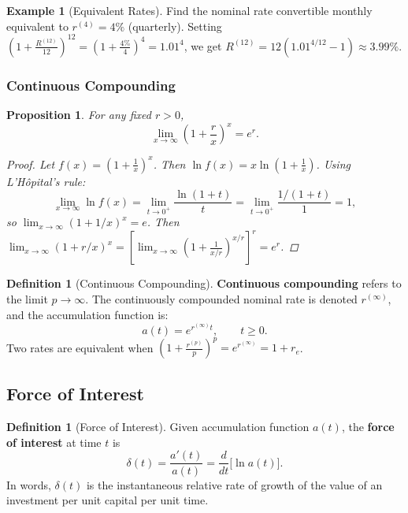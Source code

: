 \documentclass[12pt, a4paper]{article}
\theoremstyle{plain}
\newtheorem{proposition}[theorem]{Proposition}
\theoremstyle{definition}
\newtheorem{definition}[theorem]{Definition}
\newtheorem{example}[theorem]{Example}
\theoremstyle{remark}
\begin{document}
\begin{example}[Equivalent Rates]
  Find the nominal rate convertible monthly equivalent to $r^{(4)} = 4\%$ (quarterly). Setting $\left(1 + \frac{R^{(12)}}{12}\right)^{12} = \left(1 + \frac{4\%}{4}\right)^4 = 1.01^4$, we get $R^{(12)} = 12(1.01^{4/12} - 1) \approx 3.99\%$.
\end{example}

\subsubsection{Continuous Compounding}

\begin{proposition}
  For any fixed $r > 0$,
  \[
    \lim_{x \to \infty} \left(1 + \frac{r}{x}\right)^x = e^r.
  \]
  \begin{proof}
    Let $f(x) = \left(1 + \frac{1}{x}\right)^x$. Then $\ln f(x) = x \ln\!\left(1+\frac{1}{x}\right)$. Using L'Hôpital's rule:
    \[
      \lim_{x\to\infty} \ln f(x) = \lim_{t\to 0^+} \frac{\ln(1+t)}{t} = \lim_{t\to 0^+} \frac{1/(1+t)}{1} = 1,
    \]
    so $\lim_{x\to\infty}(1+1/x)^x = e$. Then $\lim_{x\to\infty}(1+r/x)^x = \left[\lim_{x\to\infty}(1+\frac{1}{x/r})^{x/r}\right]^r = e^r$.
  \end{proof}
\end{proposition}

\begin{definition}[Continuous Compounding]
  \textbf{Continuous compounding} refers to the limit $p \to \infty$. The continuously compounded nominal rate is denoted $r^{(\infty)}$, and the accumulation function is:
  \[
    a(t) = e^{r^{(\infty)} t}, \qquad t \geq 0.
  \]
  Two rates are equivalent when $\left(1 + \frac{r^{(p)}}{p}\right)^p = e^{r^{(\infty)}} = 1 + r_e$.
\end{definition}

\subsection{Force of Interest}

\begin{definition}[Force of Interest]
  Given accumulation function $a(t)$, the \textbf{force of interest} at time $t$ is
  \[
    \delta(t) = \frac{a'(t)}{a(t)} = \frac{d}{dt}\bigl[\ln a(t)\bigr].
  \]
  In words, $\delta(t)$ is the instantaneous relative rate of growth of the value of an investment per unit capital per unit time.
\end{definition}
\end{document}
